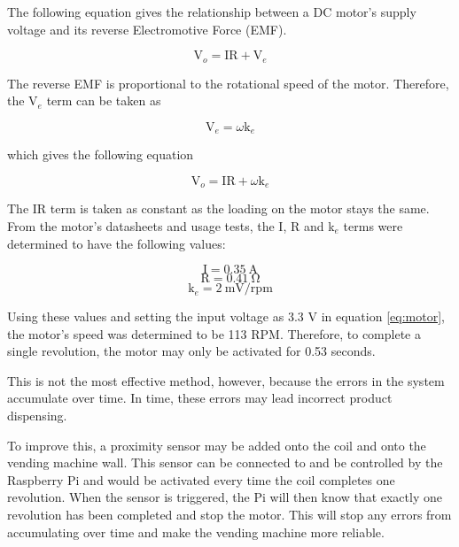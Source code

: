 The following equation gives the relationship between a DC motor's supply
voltage and its reverse Electromotive Force (EMF).

\[ \mathrm{V}_o = \mathrm{IR} + \mathrm{V}_e\]

The reverse EMF is proportional to the rotational speed of the motor. Therefore,
the V$_e$ term can be taken as

\[ \mathrm{V}_e = \omega\mathrm{k}_e\]

which gives the following equation

\begin{equation}
 \label{eq:motor}
 \mathrm{V}_o = \mathrm{IR} + \omega\mathrm{k}_e
\end{equation}

The IR term is taken as constant as the loading on the motor stays the same.
From the motor's datasheets and usage tests, the I, R and k$_e$ terms were
determined to have the following values:

\[\mathrm{I} = 0.35\mathrm{\ A}\]
\[\mathrm{R} = 0.41\mathrm{\ \Omega}\]
\[ \mathrm{k}_e = 2 \mathrm{\ mV/rpm}\]

Using these values and setting the input voltage as 3.3 V in equation
\ref{eq:motor}, the motor's speed was determined to be 113 RPM. Therefore, to
complete a single revolution, the motor may only be activated for 0.53 seconds. 

This is not the most effective method, however, because the errors in the system
accumulate over time. In time, these errors may lead incorrect product
dispensing. 

To improve this, a proximity sensor may be added onto the coil and onto the
vending machine wall. This sensor can be connected to and be controlled by the
Raspberry Pi and would be activated every time the coil completes one
revolution. When the sensor is triggered, the Pi will then know that exactly
one revolution has been completed and stop the motor. This will stop any errors
from accumulating over time and make the vending machine more reliable. 
